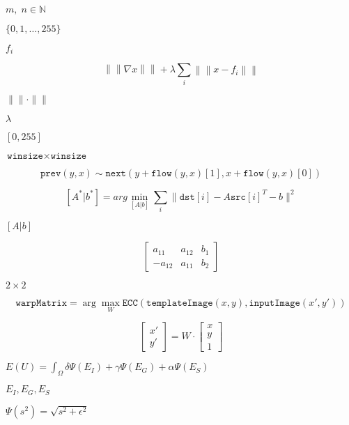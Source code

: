 \documentclass{article}
\begin{document}
$m,\;n\in\mathbb{N}$
\pagebreak

$\{0,1,\dots,255\}$
\pagebreak

$f_i$
\pagebreak

\[\left\|\left\|\nabla x\right\|\right\| + \lambda\sum_i\left\|\left\|x-f_i\right\|\right\|\]
\pagebreak

$\|\|\cdot\|\|$
\pagebreak

$\lambda$
\pagebreak

$[0,255]$
\pagebreak

$\texttt{winsize}\times\texttt{winsize}$
\pagebreak

\[\texttt{prev} (y,x) \sim \texttt{next} ( y + \texttt{flow} (y,x)[1], x + \texttt{flow} (y,x)[0])\]
\pagebreak

\[[A^*|b^*] = arg \min _{[A|b]} \sum _i \| \texttt{dst}[i] - A { \texttt{src}[i]}^T - b \| ^2\]
\pagebreak

$[A|b]$
\pagebreak

\[\begin{bmatrix} a_{11} & a_{12} & b_1 \\ -a_{12} & a_{11} & b_2 \end{bmatrix}\]
\pagebreak

$2\times 2$
\pagebreak

\[\texttt{warpMatrix} = \arg\max_{W} \texttt{ECC}(\texttt{templateImage}(x,y),\texttt{inputImage}(x',y'))\]
\pagebreak

\[\begin{bmatrix} x' \\ y' \end{bmatrix} = W \cdot \begin{bmatrix} x \\ y \\ 1 \end{bmatrix}\]
\pagebreak

$E(U) = \int_{\Omega} \delta \Psi(E_I) + \gamma \Psi(E_G) + \alpha \Psi(E_S) $
\pagebreak

$E_I,E_G,E_S$
\pagebreak

$\Psi(s^2)=\sqrt{s^2+\epsilon^2}$
\pagebreak
\end{document}

